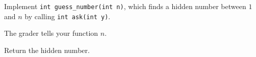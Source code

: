 Implement \texttt{int guess\_number(int n)}, which finds a hidden number between
$1$ and $n$ by calling \texttt{int ask(int y)}.

The grader tells your function $n$.

Return the hidden number.
